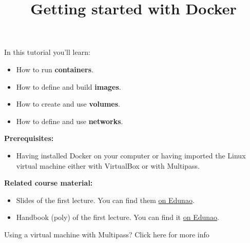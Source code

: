 \documentclass[
]{article}
\title{Getting started with Docker}
\author{}
\date{\vspace{-2.5em}}
\providecommand{\tightlist}{%
  \setlength{\itemsep}{0pt}\setlength{\parskip}{0pt}}
\theoremstyle{definition}
\theoremstyle{definition}
\theoremstyle{definition}
\theoremstyle{remark}
\begin{document}
\maketitle

In this tutorial you'll learn:

\begin{itemize}
\tightlist
\item
  How to run \textbf{containers}.
\item
  How to define and build \textbf{images}.
\item
  How to create and use \textbf{volumes}.
\item
  How to define and use \textbf{networks}.
\end{itemize}

\textbf{Prerequisites:}

\begin{itemize}
\tightlist
\item
  Having installed Docker on your computer or having imported the Linux virtual machine either with VirtualBox or with Multipass.
\end{itemize}

\textbf{Related course material:}

\begin{itemize}
\item
  Slides of the first lecture. You can find them \href{https://centralesupelec.edunao.com/pluginfile.php/426017/mod_resource/content/9/cloud-cs-lecture-1.pdf}{on Edunao}.
\item
  Handbook (poly) of the first lecture. You can find it \href{https://centralesupelec.edunao.com/pluginfile.php/435165/mod_resource/content/10/chapter-1.pdf}{on Edunao}.
\end{itemize}

Using a virtual machine with Multipass? Click here for more info
\end{document}
